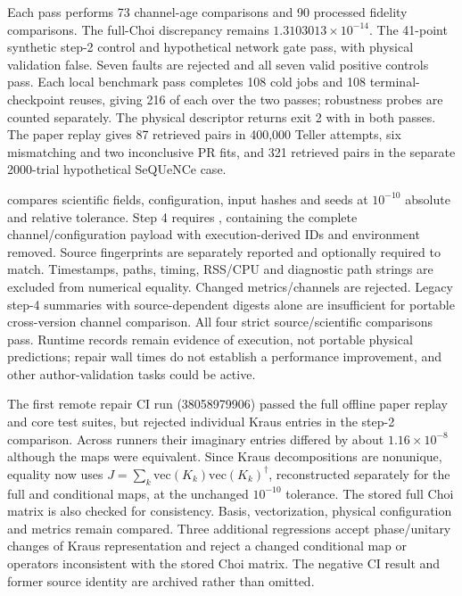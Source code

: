 Each pass performs 73 channel-age comparisons and 90 processed fidelity comparisons. The full-Choi discrepancy remains $1.3103013\times10^{-14}$. The 41-point synthetic step-2 control and hypothetical network gate pass, with physical validation false. Seven faults are rejected and all seven valid positive controls pass. Each local benchmark pass completes 108 cold jobs and 108 terminal-checkpoint reuses, giving 216 of each over the two passes; robustness probes are counted separately. The physical descriptor returns exit 2 with  in both passes. The paper replay gives 87 retrieved pairs in 400,000 Teller attempts, six mismatching and two inconclusive PR fits, and 321 retrieved pairs in the separate 2000-trial hypothetical SeQUeNCe case.

 compares scientific fields, configuration, input hashes and seeds at $10^{-10}$ absolute and relative tolerance. Step 4 requires , containing the complete channel/configuration payload with execution-derived IDs and environment removed. Source fingerprints are separately reported and optionally required to match. Timestamps, paths, timing, RSS/CPU and diagnostic path strings are excluded from numerical equality. Changed metrics/channels are rejected. Legacy step-4 summaries with source-dependent digests alone are insufficient for portable cross-version channel comparison. All four strict source/scientific comparisons pass. Runtime records remain evidence of execution, not portable physical predictions; repair wall times do not establish a performance improvement, and other author-validation tasks could be active.

The first remote repair CI run (38058979906) passed the full offline paper replay and core test suites, but rejected individual Kraus entries in the step-2 comparison. Across runners their imaginary entries differed by about $1.16\times10^{-8}$ although the maps were equivalent. Since Kraus decompositions are nonunique, equality now uses $J=\sum_k\mathrm{vec}(K_k)\mathrm{vec}(K_k)^\dagger$, reconstructed separately for the full and conditional maps, at the unchanged $10^{-10}$ tolerance. The stored full Choi matrix is also checked for consistency. Basis, vectorization, physical configuration and metrics remain compared. Three additional regressions accept phase/unitary changes of Kraus representation and reject a changed conditional map or operators inconsistent with the stored Choi matrix. The negative CI result and former source identity are archived rather than omitted.

